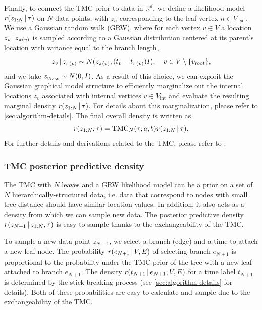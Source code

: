 Finally, to connect the TMC prior to data in $\mathbb{R}^d$, we define a likelihood model $r(z_{1:N} \,|\, \tau)$ on $N$ data points, with $z_n$ corresponding to the leaf vertex $n \in V_\text{leaf}$.
We use a Gaussian random walk (GRW), where for each vertex $v \in V$ a location $z_v \,|\, z_{\pi(v)}$ is sampled according to a Gaussian distribution centered at its parent's location with variance equal to the branch length,
\begin{equation}
    z_v \,|\, z_{\pi(v)} \sim N(z_{\pi(v)}, (t_v - t_{\pi(v)})I), \quad v \in V \setminus \{v_\text{root}\},
    \notag
\end{equation}
and we take $z_{v_\text{root}} \sim N(0, I)$.
As a result of this choice, we can exploit the Gaussian graphical model structure to efficiently marginalize out the internal locations $z_v$ associated with internal vertices $v \in V_\text{int}$ and evaluate the resulting marginal density $r(z_{1:N} \,|\, \tau)$. For details
about this marginalization, please refer to \autoref{sec:algorithm-details}.
The final overall density is written as
\begin{equation}
    r(z_{1:N}, \tau) = \mathrm{TMC}_N(\tau; a, b)r(z_{1:N} \,|\, \tau).
\end{equation}
For further details and derivations related to the TMC,
please refer to \citet{boyles2012time}.

\subsubsection{TMC posterior predictive density}
The TMC with $N$ leaves and a GRW likelihood model can be a prior on a set of $N$ hierarchically-structured data, i.e. data that correspond to nodes with small tree distance should have similar location values.
In addition, it also acts as a density from which we can sample new data.
The posterior predictive density $r(z_{N + 1} \,|\, z_{1:N}, \tau)$ is easy to sample thanks to the exchangeability of the TMC.

To sample a new data point $z_{N + 1}$, we select a branch (edge) and a time to attach a new leaf node.
The probability $r(e_{N+1} \,|\, V, E)$ of selecting branch $e_{N+1}$ is proportional to the probability under the TMC prior of the tree with a new leaf attached to branch $e_{N+1}$.
The density $r(t_{N+1} \,|\, e_{N+1}, V, E)$ for a time label $t_{N+1}$ is determined by the stick-breaking process (see \autoref{sec:algorithm-details} for details).
Both of these probabilities are easy to calculate and sample due to the exchangeability of the TMC.

